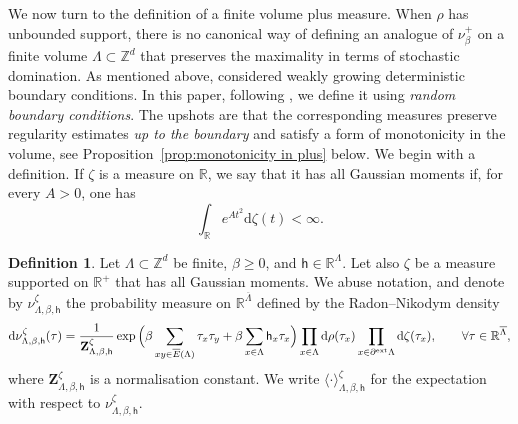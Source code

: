 \documentclass[11pt,a4paper]{article}
\numberwithin{equation}{section}
\theoremstyle{plain}
\theoremstyle{definition}
\newtheorem{Def}[Thm]{Definition}
\begin{document}
We now turn to the definition of a finite volume plus measure. When $\rho$ has unbounded support, there is no canonical way of defining an analogue of $\nu^+_{\beta}$ on a finite volume $\Lambda \subset \mathbb Z^d$ that preserves the maximality in terms of stochastic domination. As mentioned above, \cite{LebowitzPresutti1976} considered weakly growing deterministic boundary conditions. In this paper, following \cite{PV26}, we define it using \emph{random boundary conditions}. The upshots are that the corresponding measures preserve regularity estimates \emph{up to the boundary} and satisfy a form of monotonicity in the volume, see Proposition~\ref{prop:monotonicity in plus} below. We begin with a definition. If $\zeta$ is a measure on $\mathbb R$, we say that it has all Gaussian moments if, for every $A>0$, one has
\begin{equation}
    \int_{\mathbb R}e^{At^2}\mathrm{d}\zeta(t)<\infty.
\end{equation}

\begin{Def}\label{def:+measure spin finite volume}
    Let $\Lambda \subset \mathbb Z^d$ be finite, $\beta\geq 0$, and $\mathsf{h}\in \mathbb R^\Lambda$. Let also $\zeta$ be a measure supported on $\mathbb R^+$ that has all Gaussian moments. We abuse notation, and denote by $\nu^\zeta_{\Lambda,\beta, \mathsf{h}}$ the probability measure on $\mathbb R^{\overline{\Lambda}}$ defined by the Radon--Nikodym density
\begin{equation}
\mathrm{d}\nu^\zeta_{\Lambda,\beta,\mathsf{h}}(\tau) = \frac{1}{\mathbf{Z}^\zeta_{\Lambda,\beta,\mathsf{h}}} \exp\Big(\beta \sum_{xy\in \overline E(\Lambda)} \tau_x \tau_y
+\beta \sum_{x\in \Lambda}\mathsf{h}_x\tau_x\Big)\prod_{x\in \Lambda}\mathrm{d}\rho(\tau_x) \prod_{x \in \partial^{\textup{ext}} \Lambda} \mathrm{d}\zeta (\tau_x), \qquad \forall \tau \in \mathbb R^{\overline \Lambda},
\end{equation}
where $\mathbf{Z}^\zeta_{\Lambda,\beta,\mathsf{h}}$ is a normalisation constant. We write $\langle \cdot \rangle^\zeta_{\Lambda,\beta,\mathsf{h}}$ for the expectation with respect to $\nu^\zeta_{\Lambda,\beta,\mathsf{h}}$. 
\end{Def}
\end{document}
